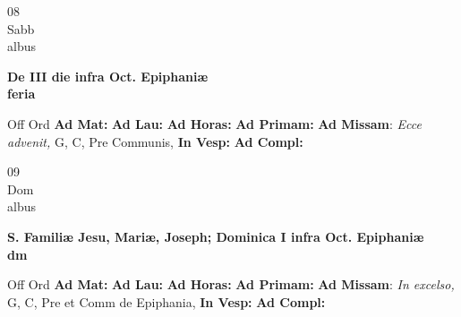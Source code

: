 \documentclass[10pt, openany]{book}
\begin{document}
    \begin{center}
        \begin{minipage}{3.5in}
            \vspace{2em}
            \begin{minipage}{0.5in}
                {\Huge 08} \\
                {\normalsize Sabb} \\
                {\normalsize albus}
            \end{minipage}
            \begin{minipage}{3.0in}
                \textbf{ \large De III die infra Oct. Epiphaniæ \\
                \textnormal{\normalsize feria}} \\ 
            \end{minipage}
            \begin{justify}Off Ord
                \textbf{Ad Mat: }
                \textbf{Ad Lau: }
                \textbf{Ad Horas: }
                \textbf{Ad Primam: }\textbf{Ad Missam}: \textit{Ecce advenit,} G, C, Pre Communis,  
                \textbf{In Vesp: }
                \textbf{Ad Compl: }
            \end{justify}
        \end{minipage}
    \end{center}

    \begin{center}
        \begin{minipage}{3.5in}
            \vspace{2em}
            \begin{minipage}{0.5in}
                {\Huge 09} \\
                {\normalsize Dom} \\
                {\normalsize albus}
            \end{minipage}
            \begin{minipage}{3.0in}
                \textbf{ \large S. Familiæ Jesu, Mariæ, Joseph; Dominica I infra Oct. Epiphaniæ \\
                \textnormal{\normalsize dm}} \\ 
            \end{minipage}
            \begin{justify}Off Ord
                \textbf{Ad Mat: }
                \textbf{Ad Lau: }
                \textbf{Ad Horas: }
                \textbf{Ad Primam: }\textbf{Ad Missam}: \textit{In excelso,} G, C, Pre et Comm de Epiphania,  
                \textbf{In Vesp: }
                \textbf{Ad Compl: }
            \end{justify}
        \end{minipage}
    \end{center}
\end{document}
